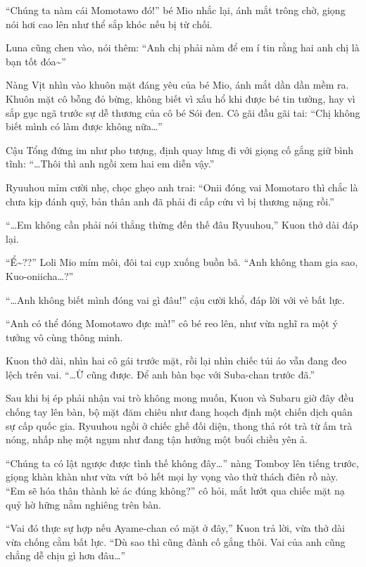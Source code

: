 \documentclass[../main.tex]{subfiles}
\begin{document}
``Chúng ta nàm cái Momotawo đó!'' bé Mio nhắc lại, ánh mắt trông chờ, giọng nói hơi cao lên như thể sắp khóc nếu bị từ chối.

Luna cũng chen vào, nói thêm: ``Anh chị phải nàm để em í tin rằng hai anh chị là bạn tốt đóa\~{}''

Nàng Vịt nhìn vào khuôn mặt đáng yêu của bé Mio, ánh mắt dần dần mềm ra. Khuôn mặt cô bỗng đỏ bừng, không biết vì xấu hổ khi được bé tin tưởng, hay vì sắp gục ngã trước sự dễ thương của cô bé Sói đen. Cô gãi đầu gãi tai: ``Chị không biết mình có làm được không nữa\dots''

Cậu Tổng đứng im như pho tượng, định quay lưng đi với giọng cố gắng giữ bình tĩnh: ``\dots Thôi thì anh ngồi xem hai em diễn vậy.''

Ryuuhou mỉm cười nhẹ, chọc ghẹo anh trai: ``Onii đóng vai Momotaro thì chắc là chưa kịp đánh quỷ, bản thân anh đã phải đi cấp cứu vì bị thương nặng rồi.''

``\dots Em không cần phải nói thẳng thừng đến thế đâu Ryuuhou,'' Kuon thở dài đáp lại.

``Ể\~{}??'' Loli Mio mím môi, đôi tai cụp xuống buồn bã. ``Anh không tham gia sao, Kuo-oniicha\dots?''

``\dots Anh không biết mình đóng vai gì đâu!'' cậu cười khổ, đáp lời với vẻ bất lực.

``Anh có thể đóng Momotawo đực mà!'' cô bé reo lên, như vừa nghĩ ra một ý tưởng vô cùng thông minh.

Kuon thở dài, nhìn hai cô gái trước mặt, rồi lại nhìn chiếc túi áo vẫn đang đeo lệch trên vai. ``\dots Ừ cũng được. Để anh bàn bạc với Suba-chan trước đã.''

\ct

Sau khi bị ép phải nhận vai trò không mong muốn, Kuon và Subaru giờ đây đều chống tay lên bàn, bộ mặt đăm chiêu như đang hoạch định một chiến dịch quân sự cấp quốc gia. Ryuuhou ngồi ở chiếc ghế đối diện, thong thả rót trà từ ấm trà nóng, nhấp nhẹ một ngụm như đang tận hưởng một buổi chiều yên ả.

``Chúng ta có lật ngược được tình thế không đây\dots'' nàng Tomboy lên tiếng trước, giọng khàn khàn như vừa vứt bỏ hết mọi hy vọng vào thử thách điên rồ này. ``Em sẽ hóa thân thành kẻ ác đúng không?'' cô hỏi, mắt lướt qua chiếc mặt nạ quỷ hờ hững nằm nghiêng trên bàn.

``Vai đó thực sự hợp nếu Ayame-chan có mặt ở đây,'' Kuon trả lời, vừa thở dài vừa chống cằm bất lực. ``Dù sao thì cũng đành cố gắng thôi. Vai của anh cũng chẳng dễ chịu gì hơn đâu\dots''
\end{document}
